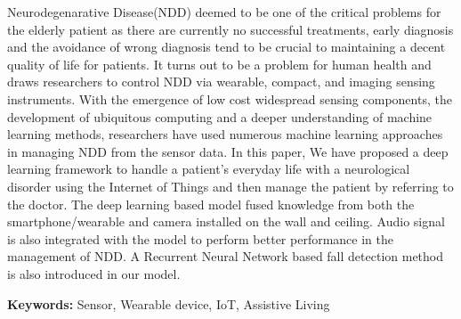 Neurodegenarative Disease(NDD) deemed to be one of the critical problems for the elderly patient as there are currently no successful treatments, early diagnosis and the avoidance of wrong diagnosis tend to be crucial to maintaining a decent quality of life for patients. It turns out to be a problem for human health and draws researchers to control NDD via wearable, compact, and imaging sensing instruments. With the emergence of low cost widespread sensing components, the development of ubiquitous computing and a deeper understanding of machine learning methods, researchers have used numerous machine learning approaches in managing NDD from the sensor data. In this paper, We have proposed a deep learning framework to handle a patient's everyday life with a neurological disorder using the Internet of Things and then manage the patient by referring to the doctor. The deep learning based model fused knowledge from both the smartphone/wearable and camera installed on the wall and ceiling. Audio signal is also integrated with the model to perform better performance in the management of NDD. A Recurrent Neural Network based fall detection method is also introduced in our model.









\vspace{8pt}
\textbf{Keywords:} Sensor, Wearable device, IoT, Assistive Living 



